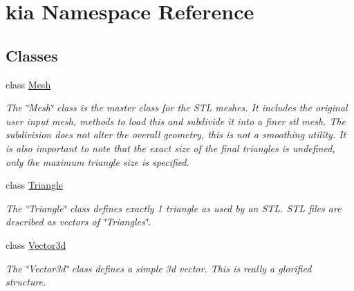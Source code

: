 \hypertarget{namespacekia}{\section{kia Namespace Reference}
\label{namespacekia}
}
\subsection*{Classes}
\begin{DoxyCompactItemize}
\item 
class \hyperlink{classkia_1_1Mesh}{Mesh}
\begin{DoxyCompactList}\small\item\em The \char`\"{}\-Mesh\char`\"{} class is the master class for the S\-T\-L meshes. It includes the original user input mesh, methods to load this and subdivide it into a finer stl mesh. The subdivision does not alter the overall geometry, this is not a smoothing utility. It is also important to note that the exact size of the final triangles is undefined, only the maximum triangle size is specified. \end{DoxyCompactList}\item 
class \hyperlink{classkia_1_1Triangle}{Triangle}
\begin{DoxyCompactList}\small\item\em The \char`\"{}\-Triangle\char`\"{} class defines exactly 1 triangle as used by an S\-T\-L. S\-T\-L files are described as vectors of \char`\"{}\-Triangles\char`\"{}. \end{DoxyCompactList}\item 
class \hyperlink{classkia_1_1Vector3d}{Vector3d}
\begin{DoxyCompactList}\small\item\em The \char`\"{}\-Vector3d\char`\"{} class defines a simple 3d vector. This is really a glorified structure. \end{DoxyCompactList}\end{DoxyCompactItemize}
